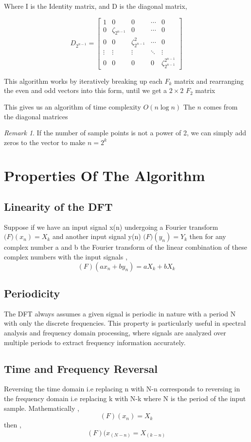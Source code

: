 \documentclass[11pt]{amsart}
\theoremstyle{definition}
\theoremstyle{remark}
\newtheorem{rem}[thm]{Remark}
\numberwithin{equation}{section}
\begin{document}
Where I is the Identity matrix, and D is the diagonal matrix,

\[
	D_{2^{n-1}} = \begin{bmatrix}
		1 & 0 & 0 & \cdots & 0 \\
		0 & \zeta_{2^{n-1}} & 0 &\cdots & 0\\
		0 & 0 & \zeta_{2^{n-1}}^2 & \cdots & 0 \\
		\vdots & \vdots & \vdots  &  \ddots & \vdots \\
		0 & 0 & 0 & 0 & \zeta_{2^{n-1}}^{2^{n-1}}
	\end{bmatrix}
\]

This algorithm works by iteratively breaking up each $F_k$ matrix and rearranging the even and odd vectors into this form, until we get a $2\times 2$ $F_2$ matrix

This gives us an algorithm of time complexity $O(n \log{n})$ The $n$ comes from the diagonal matrices 

\begin{rem}
	If the number of sample points is not a power of 2, we can simply add zeros to the vector to make $n = 2^{k}$
\end{rem}
\section{Properties Of The Algorithm}
\subsection{Linearity of the DFT}
Suppose if we have an input signal x(n) undergoing a Fourier transform $\mathscr(F)(x_n) = X_k$ and another input  signal y(n) $\mathscr(F)(y_n) = Y_k$ then for any complex number a and b the  Fourier transform of the linear combination of these complex numbers with the input signals , 
\[(F)(ax_n + by_n) = aX_k + bX_k\]

\subsection{Periodicity}
The DFT always assumes a given signal is periodic in nature with a period N with only the discrete frequencies.
This property is particularly useful in spectral analysis and frequency domain processing, where signals are analyzed over multiple periods to extract frequency information accurately.

\subsection{Time and Frequency Reversal}
Reversing the time domain i.e replacing n with N-n corresponds to reversing in the frequency domain i.e replacing k with N-k where N is the period of the input sample.
Mathematically ,
\[(F)(x_n) = X_k \] then , 
\[(F)(x_(N-n) = X_(k-n)\]
\end{document}
